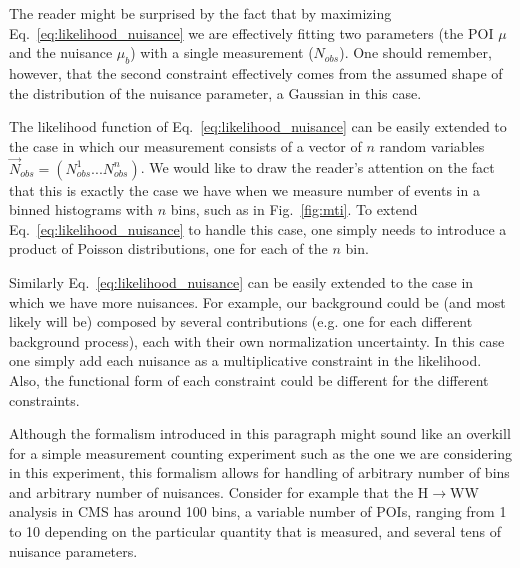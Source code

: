 \documentclass[a4paper,12pt]{article}
\begin{document}
The reader might be surprised by the fact that by maximizing
Eq.~\ref{eq:likelihood_nuisance} we are effectively fitting two parameters
(the POI $\mu$ and the nuisance $\mu_b$) with a single measurement
($N_{obs}$). One should remember, however, that the second constraint effectively comes from the assumed shape of
the distribution of the nuisance parameter, a Gaussian in this case.

The likelihood function of Eq.~\ref{eq:likelihood_nuisance} can be easily
extended to the case in which our measurement consists of a vector of
$n$ random variables $\vec{N}_{obs}=(N_{obs}^1...N_{obs}^n)$. We would like to draw the
reader's attention on the fact that this is exactly the case we have when we measure number
of events in a binned histograms with $n$ bins, such as in
Fig.~\ref{fig:mti}. To extend Eq.~\ref{eq:likelihood_nuisance} to handle this
case, one simply needs to introduce a product of Poisson distributions, one
for each of the $n$ bin. 

Similarly Eq.~\ref{eq:likelihood_nuisance} can be easily
extended to the case in which we have more nuisances. For example, our
background could be (and most likely will be) composed by several contributions (e.g. one for each different
background process), each with their own normalization uncertainty. In this case one simply add each nuisance as a
multiplicative constraint in the likelihood. Also, the functional form of each constraint could
be different for the different constraints.

Although the formalism introduced in this paragraph might sound like an
overkill for a simple measurement counting experiment such as the one we are
considering in this experiment, this formalism allows for handling of
arbitrary number of bins and arbitrary number of nuisances. Consider for
example that the H$\rightarrow{}$WW analysis in CMS has around 100 bins, a  variable number of
POIs, ranging from 1 to 10 depending on the particular quantity that is
measured, and
several tens of nuisance parameters.
\end{document}
